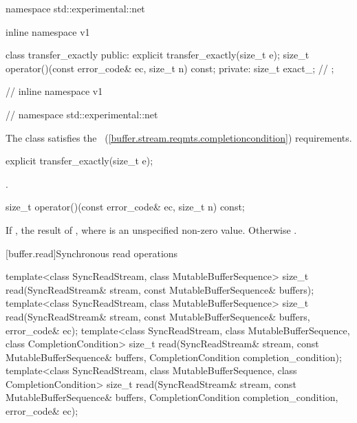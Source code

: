 \begin{codeblock}
namespace std::experimental::net {
inline namespace v1 {

  class transfer_exactly
  {
  public:
    explicit transfer_exactly(size_t e);
    size_t operator()(const error_code& ec, size_t n) const;
  private:
    size_t exact_; // \expos
  };

} // inline namespace v1
} // namespace std::experimental::net
\end{codeblock}

\pnum
The class  satisfies the ~(\ref{buffer.stream.reqmts.completioncondition}) requirements.

\begin{itemdecl}
explicit transfer_exactly(size_t e);
\end{itemdecl}

\begin{itemdescr}
\pnum
\postconditions {}.
\end{itemdescr}

\begin{itemdecl}
size_t operator()(const error_code& ec, size_t n) const;
\end{itemdecl}

\begin{itemdescr}
\pnum
\returns If , the result of , where  is an unspecified non-zero value. Otherwise .
\end{itemdescr}



[buffer.read]{Synchronous read operations}

%
\begin{itemdecl}
template<class SyncReadStream, class MutableBufferSequence>
  size_t read(SyncReadStream& stream,
              const MutableBufferSequence& buffers);
template<class SyncReadStream, class MutableBufferSequence>
  size_t read(SyncReadStream& stream,
              const MutableBufferSequence& buffers, error_code& ec);
template<class SyncReadStream, class MutableBufferSequence,
  class CompletionCondition>
    size_t read(SyncReadStream& stream,
                const MutableBufferSequence& buffers,
                CompletionCondition completion_condition);
template<class SyncReadStream, class MutableBufferSequence,
  class CompletionCondition>
    size_t read(SyncReadStream& stream,
                const MutableBufferSequence& buffers,
                CompletionCondition completion_condition,
                error_code& ec);
\end{itemdecl}

